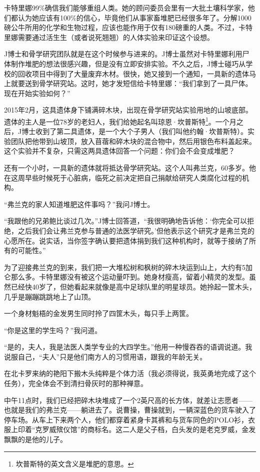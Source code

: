 \documentclass[12pt,oneside]{book}
\begin{document}
卡特里娜99\%确信我们能够重组人类。她的顾问委员会里有一大批土壤科学家，他们都认为她应该有100\%的信心，毕竟他们从事家畜堆肥已经很多年了。分解1000磅公牛所用的化学和生物过程，应该也能作用于仅有180磅重的人类。不过，卡特里娜需要通过活生生（或者说死翘翘）的人体实验来印证这个设想。

J博士和骨学研究团队就是在这个时候参与进来的。J博士虽然对卡特里娜利用尸体制作堆肥的想法很感兴趣，但是没有立即安排实验。不久之后，J博士碰巧从学校的回收项目中得到了大量废弃木材。很快，她又接到一个通知，一具新的遗体马上就要送到骨学研究站。这时，她才发短信给卡特里娜：“我们拿到了一具尸体。现在开始实验如何？”

2015年2月，这具遗体身下铺满碎木块，出现在骨学研究站实验用地的山坡底部。遗体的主人是一位78岁的老妇人，我们给她起名叫琼恩·坎普斯特\footnote{坎普斯特的英文含义是堆肥的意思。}。一个月之后，J博士收到了第二具遗体，是一个大个子男人（我们叫他约翰·坎普斯特）。实验团队把他带到山坡顶，放入苜蓿和碎木块的混合物中，然后用银色布料盖起来。这个实验并不复杂，只需这两具遗体回答一个问题：你们会不会变成堆肥？

还有一个小时，一具新的遗体就将抵达骨学研究站。这个人叫弗兰克，60多岁。他在这周早些时候死于心脏病，临死之前决定把自己捐献给研究人类腐化过程的机构。

“弗兰克的家人知道堆肥这件事吗？”我问J博士。

“我跟他的兄弟鲍比谈过几次。”J博士回答道，“我很明确地告诉他：‘你完全可以拒绝，之后我们会让弗兰克参与普通的法医学研究。’但他表示这个研究才是弗兰克的心愿所在。说实话，当你签字确认要把遗体捐到我们这种机构时，就等于接纳了所有的可能性。”

为了迎接弗兰克的到来，我们把一大堆松树和枫树的碎木块运到山上，大约有5加仑那么多。卡特里娜没有被这个运动量吓到。她身材瘦高，留着小精灵的发型。虽然已经快40岁了，但她看起来就像是高中足球队里的明星球员。她拎起一筐木头，几乎是蹦蹦跳跳地上了山顶。

一个身材魁梧的金发男生同时拎了四筐木头，每只手上两筐。

“你是这里的学生吗？”我问道。

“是的，夫人，我是法医人类学专业的大四学生。”他用一种慢吞吞的语调说道。我说服自己，“夫人”只是他们南方人的习惯用语，跟我的年龄无关。

在北卡罗来纳的艳阳下搬木头纯粹是个体力活（我必须得说，我英勇地完成了这个任务），完全体会不到清扫骨灰时的那种禅意。

中午11点时，我们已经把碎木块堆成了一个2英尺高的长方体，就差让志愿者——也就是我们的弗兰克——躺进去了。说曹操，曹操就到，一辆深蓝色的货车驶入了停车场。从车上下来两个人，他们都穿着紧身卡其裤和与货车同色的POLO衫，衣服上印着“克罗威殡仪馆”的商标名。这二人是父子档，白头发的是老克罗威，金发飘飘的是他的儿子。
\end{document}
